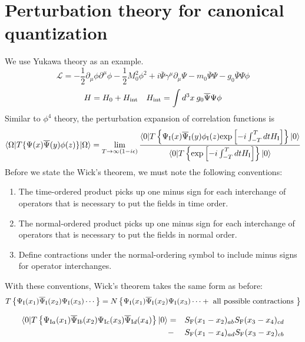 \section{Perturbation theory for canonical quantization}
\noindent
We use Yukawa theory as an example.
\[\mathcal{L} = -\frac{1}{2}\partial_{\mu} \phi \partial^{\mu} \phi -\frac{1}{2}M_0^2 \phi^2 + i\overline{\Psi} \gamma^{\mu} \partial_{\mu} \Psi - m_0\overline{\Psi}\Psi -g_0 \overline{\Psi}\Psi\phi\]
\[H = H_0 + H_{\rm int} \quad H_{\rm int} = \int d^3 x \: g_0 \overline{\Psi}\Psi\phi \]
Similar to $\phi^4$ theory, the perturbation expansion of correlation functions is
\[\langle \Omega | T \{\Psi(x) \overline{\Psi}(y) \phi(z) \} | \Omega \rangle = \lim_{T \to \infty(1-i\epsilon)} \frac{\langle 0 | T \left\{ \Psi_{\rm I}(x) \overline{\Psi}_{\rm I}(y) \phi_{\rm I}(z) \mathrm{exp} \left[ -i \int_{-T}^{T} dt H_{\rm I} \right]\right\} | 0 \rangle}{\langle 0 | T \left\{ \mathrm{exp} \left[ -i \int_{-T}^{T} dt H_{\rm I} \right]\right\} | 0 \rangle}\]
Before we state the Wick's theorem, we must note the following conventions:
\begin{enumerate}
\item  The time-ordered product picks up one minus sign for each interchange of operators that is necessary to put the fields in time order.
\item The normal-ordered product picks up one minus sign for each interchange of operators that is necessary to put the fields in normal order.
\item Define contractions under the normal-ordering symbol to include minus signs for operator interchanges.
\end{enumerate}
With these conventions, Wick's theorem takes the same form as before:
\[T \left\{ \Psi_{\rm I}(x_1) \overline{\Psi}_{\rm I}(x_2)  \Psi_{\rm I}(x_3) \cdots \right\} = N \left\{\Psi_{\rm I}(x_1) \overline{\Psi}_{\rm I}(x_2)  \Psi_{\rm I}(x_3) \cdots + \mbox{ all possible contractions }\right\} \]
\begin{example}
\begin{eqnarray}
\langle 0 | T \left\{ \Psi_{{\rm I}a}(x_1) \overline{\Psi}_{{\rm I}b}(x_2) \Psi_{{\rm I}c}(x_3) \overline{\Psi}_{{\rm I}d}(x_4)\right\}| 0 \rangle &=& S_{\rm F}(x_1-x_2)_{ab}S_{\rm F}(x_3-x_4)_{cd} \nonumber \\
&-& S_{\rm F}(x_1-x_4)_{ad}S_{\rm F}(x_3-x_2)_{cb} \nonumber
\end{eqnarray}
\end{example}

